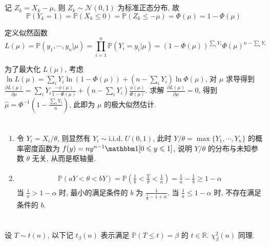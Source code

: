 \documentclass[8pt]{article}
\theoremstyle{compact}
\def\le{\leqslant}
\def\ge{\geqslant}
\def\P#1{\mathbb{P}\left({#1}\right)}
\begin{document}
\section{}
记 $Z_k = X_k - \mu$, 则 $Z_k \sim \mathcal N(0, 1)$ 为标准正态分布, 故
$$\P{Y_k = 1} = \P{X_k \le 0} = \P{Z_k \le -\mu} = \Phi(\mu) = 1 - \Phi(\mu)$$

定义似然函数 $$L(\mu) = \P{y_1, \cdots, y_n | \mu} = \prod_{i=1}^{n} \P{Y_i = y_i | \mu} = (1 - \Phi(\mu))^{\sum_i Y_i} \Phi(\mu)^{n - \sum_iY_i}$$

为了最大化 $L(\mu)$, 考虑 $\ln L(\mu) = \sum_i Y_i \ln (1 - \Phi(\mu)) + (n - \sum_i Y_i)\ln \Phi(\mu)$, 对 $\mu$ 求导得到 $\frac{\partial L(\mu)}{\partial \mu} = \sum_i Y_i \frac{-\phi(\mu)}{1 - \Phi(\mu)} + (n - \sum_i Y_i)\frac{\phi(\mu)}{\Phi(\mu)}$. 求解 $\frac{\partial L(\mu)}{\partial \mu} = 0$, 得到 $\hat{\mu} = \Phi^{-1}\left(1 - \frac{\sum_i Y_i}{n}\right)$, 此即为 $\mu$ 的极大似然估计.

\section{}
\begin{enumerate}
	\item 令 $Y_i = X_i / \theta$, 则显然有 $Y_i \sim \text{i.i.d. }U(0, 1)$, 此时 $Y / \theta = \max\{Y_1, \cdots, Y_n\}$ 的概率密度函数为 $f(y) = ny^{n-1}\mathbbm 1[0 \le y \le 1]$, 说明 $Y / \theta$ 的分布与未知参数 $\theta$ 无关, 从而是枢轴量.
 \item \begin{align*}
	 \begin{split}
		 \P{aY < \theta < bY} = \P{\frac1b < \frac{Y}{\theta} < \frac1a} = \frac1a - \frac1b \ge 1 - \alpha
	 \end{split}
 \end{align*}
 当 $\frac1a > 1 - \alpha$ 时, 最小的满足条件的 $b$ 为 $\frac{1}{\frac1a - 1 + \alpha}$. 当 $\frac1a \le 1 - \alpha$ 时, 不存在满足条件的 $b$.
\end{enumerate}
\section{}

设 $T \sim t(n)$, 以下记 $t_{\beta}(n)$ 表示满足 $\P{T \le t} = \beta$ 的 $t \in \mathbb R$. $\chi^2_{\beta}(n)$ 同理.
\end{document}
